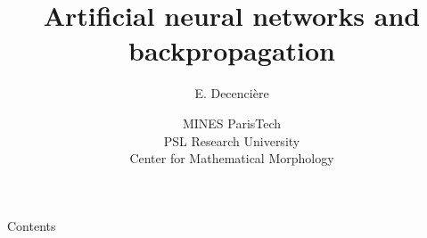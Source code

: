 \documentclass[xcolor=pdftex,dvipsnames,table,mathserif]{beamer}
\title{Artificial neural networks and backpropagation}
\author{E. Decencière}
\date{MINES ParisTech\\
  PSL Research University\\
  Center for Mathematical Morphology
}
\begin{document}
\begin{frame}
  \titlepage
\end{frame}





\begin{frame}{Contents}
  \tableofcontents
\end{frame}







\end{document}
